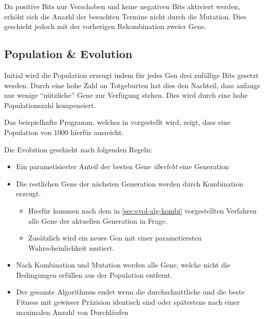 Da positive Bits nur Verschoben und keine negativen Bits aktiviert werden,
erhöht sich die Anazhl der besuchten Termine nicht durch die Mutation.
Dies geschieht jedoch mit der vorherigen Rekombination zweier Gene.

\subsection{Population \& Evolution}
Initial wird die Population erzeugt indem für jedes Gen drei zufällige Bits gesetzt werden.
Durch eine hohe Zahl an Totgeburten hat dies den Nachteil,
dass anfangs nur wenige \enquote{nützliche} Gene zur Verfügung stehen.
Dies wird durch eine hohe Populationszahl kompensiert.

Das beispielhafte Programm, welches in  vorgestellt wird,
zeigt, dass eine Population von 1000 hierfür ausreicht.

Die Evolution geschieht nach folgenden Regeln:
\begin{itemize}
    \setlength\itemsep{-0.5em}
    \item Ein parametisierter Anteil der besten Gene \textit{überlebt} eine Generation
    \item Die restlichen Gene der nächsten Generation werden durch Kombination erzeugt.
    \begin{itemize}
        \vspace{-1em}
        \setlength\itemsep{-0.5em}
        \item Hierfür kommen nach dem in \autoref{sec:evol-alg-kombi} vorgestellten Verfahren alle Gene der aktuellen Generation in Frage.
        \item Zusätzlich wird ein neues Gen mit einer parametiersten Wahrscheinlichkeit mutiert.
    \end{itemize}
    \item Nach Kombination und Mutation werden alle Gene, welche nicht die Bedingungen erfüllen aus der Population entfernt.
    \item Der gesamte Algorithmus endet wenn die durchschnittliche und die beste Fitness mit gewisser Präzision identisch sind oder spätestens nach einer maximalen Anzahl von Durchläufen
\end{itemize}

\newpage

